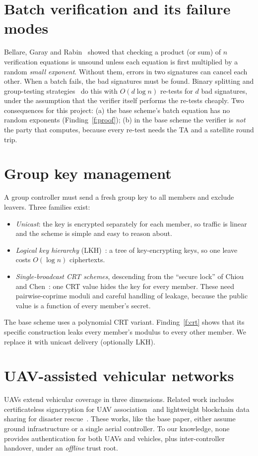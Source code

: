 \section{Batch verification and its failure modes}
Bellare, Garay and Rabin~\cite{bgr} showed that checking a product (or sum) of $n$ verification equations is unsound unless each equation is first
multiplied by a random \emph{small exponent}. Without them, errors in two signatures can cancel each other. When a batch fails, the bad signatures
must be found. Binary splitting and group-testing strategies~\cite{pastuszak,lawmatt,zaverucha} do this with $O(d\log n)$ re-tests for $d$ bad signatures,
under the assumption that the verifier itself performs the re-tests cheaply. Two consequences for this project:
(a) the base scheme's batch equation has no random exponents (Finding~\ref{f:proof});
(b) in the base scheme the verifier is \emph{not} the party that computes, because every re-test needs the TA and a satellite round trip.

\section{Group key management}
A group controller must send a fresh group key to all members and exclude leavers. Three families exist:
\begin{itemize}
  \item \emph{Unicast}: the key is encrypted separately for each member, so traffic is linear and the scheme is simple and easy to reason about.
  \item \emph{Logical key hierarchy} (LKH)~\cite{lkh,rfc2627}: a tree of key-encrypting keys, so one leave costs $O(\log n)$ ciphertexts.
  \item \emph{Single-broadcast CRT schemes}, descending from the ``secure lock'' of Chiou and Chen~\cite{securelock}: one CRT value hides the key for every member.
        These need pairwise-coprime moduli and careful handling of leakage, because the public value is a function of every member's secret.
\end{itemize}
The base scheme uses a polynomial CRT variant. Finding~\ref{f:crt} shows that its specific construction leaks every member's modulus to every other
member. We replace it with unicast delivery (optionally LKH).

\section{UAV-assisted vehicular networks}
UAVs extend vehicular coverage in three dimensions. Related work includes certificateless signcryption for UAV association~\cite{khan} and
lightweight blockchain data sharing for disaster rescue~\cite{lvbs}. These works, like the base paper, either assume ground infrastructure or a
single aerial controller. To our knowledge, none provides authentication for both UAVs and vehicles, plus inter-controller handover, under an
\emph{offline} trust root.

